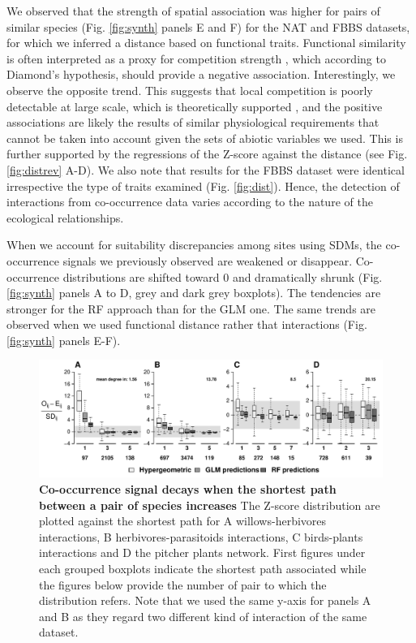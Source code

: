 We observed that the strength of spatial association was higher for
pairs of similar species (Fig. \ref{fig:synth} panels E and F) for the
NAT and FBBS datasets, for which we inferred a distance based on
functional traits. Functional similarity is often interpreted as a proxy
for competition strength \citep{Morales-Castilla2015}, which according
to Diamond's hypothesis, should provide a negative association.
Interestingly, we observe the opposite trend. This suggests that local
competition is poorly detectable at large scale, which is theoretically
supported \citep{Araujo2014}, and the positive associations are likely
the results of similar physiological requirements that cannot be taken
into account given the sets of abiotic variables we used. This is
further supported by the regressions of the Z-score against the distance
(see Fig. \ref{fig:distrev} A-D). We also note that results for the FBBS
dataset were identical irrespective the type of traits examined (Fig.
\ref{fig:dist}). Hence, the detection of interactions from co-occurrence
data varies according to the nature of the ecological relationships.

When we account for suitability discrepancies among sites using SDMs,
the co-occurrence signals we previously observed are weakened or
disappear. Co-occurrence distributions are shifted toward 0 and
dramatically shrunk (Fig. \ref{fig:synth} panels A to D, grey and dark
grey boxplots). The tendencies are stronger for the RF approach than for
the GLM one. The same trends are observed when we used functional
distance rather that interactions (Fig. \ref{fig:synth} panels E-F).

\begin{figure}[htbp]
\centering
\includegraphics[width=\textwidth]{chapitre3/figOrder.pdf}
\caption[Co-occurrence signal decays when the shortest path
between a pair of species increases]{\textbf{Co-occurrence signal decays when the shortest path
between a pair of species increases} The Z-score distribution are plotted
against the shortest path for A willows-herbivores interactions, B
herbivores-parasitoids interactions, C birds-plants interactions and D
the pitcher plants network. First figures under each grouped boxplots
indicate the shortest path associated while the figures below provide
the number of pair to which the distribution refers. Note that we used
the same y-axis for panels A and B as they regard two different kind of
interaction of the same dataset.\label{fig:shtpth}}
\end{figure}


